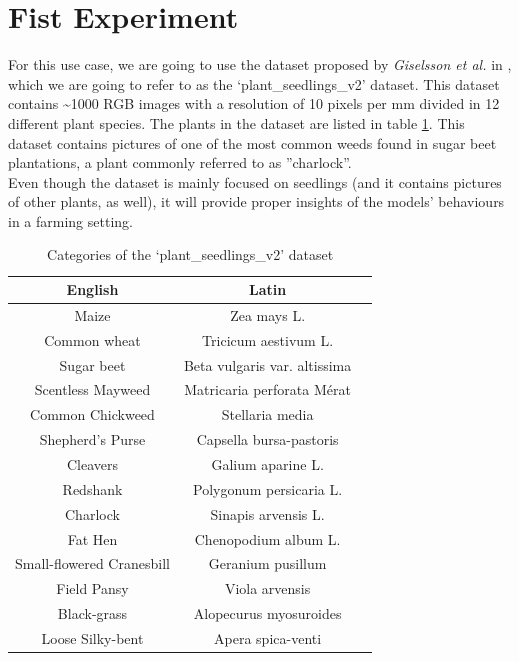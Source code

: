 \section{Fist Experiment}
For this use case, we are going to use the dataset proposed by \textit{Giselsson et al.} in \cite{giselsson2017public}, which we are going to refer to as the ‘plant\_seedlings\_v2’ dataset. This dataset contains \textasciitilde 1000 RGB images with a resolution of 10 pixels per mm divided in 12 different plant species. The plants in the dataset are listed in table \ref{tab:dataset_species}. This dataset contains pictures of one of the most common weeds found in sugar beet plantations, a plant commonly referred to as ''charlock''. \cite{cioni_weed_2010}\\
Even though the dataset is mainly focused on seedlings (and it contains pictures of other plants, as well), it will provide proper insights of the models' behaviours in a farming setting. 
\begin{table}[ht]
\centering
\begin{tabular}{|c|c|c|}
\hline
    English & Latin \\
\hline
    Maize & Zea mays L.\\
    Common wheat & Tricicum aestivum L.\\
    Sugar beet & Beta vulgaris var. altissima\\
    Scentless Mayweed & Matricaria perforata Mérat\\
    Common Chickweed & Stellaria media\\
    Shepherd’s Purse & Capsella bursa-pastoris\\
    Cleavers& Galium aparine L.\\
    Redshank& Polygonum persicaria L.\\
    Charlock& Sinapis arvensis L.\\
    Fat Hen& Chenopodium album L.\\
    Small-flowered Cranesbill & Geranium pusillum\\
    Field Pansy& Viola arvensis\\
    Black-grass& Alopecurus myosuroides\\
    Loose Silky-bent& Apera spica-venti\\
    \hline
\end{tabular}
\caption[Categories of the ‘plant\_seedlings\_v2’ dataset]{Categories of the ‘plant\_seedlings\_v2’ dataset \cite{giselsson2017public} }
\label{tab:dataset_species}
\end{table}

